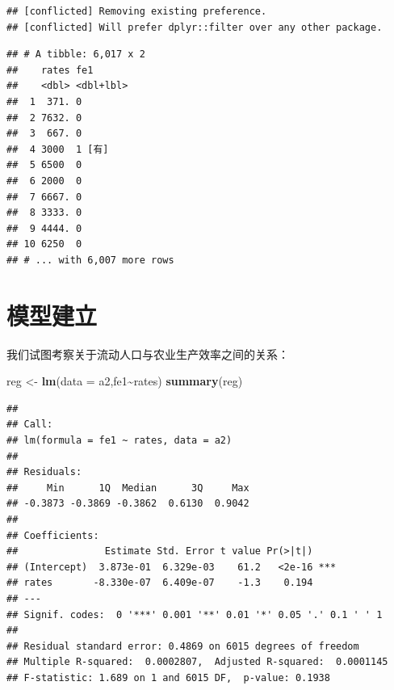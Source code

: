 \documentclass[
  oneside]{book}
\newenvironment{Shaded}{\begin{snugshade}}{\end{snugshade}}
\newcommand{\AttributeTok}[1]{\textcolor[rgb]{0.13,0.29,0.53}{#1}}
\newcommand{\DecValTok}[1]{\textcolor[rgb]{0.00,0.00,0.81}{#1}}
\newcommand{\FunctionTok}[1]{\textcolor[rgb]{0.13,0.29,0.53}{\textbf{#1}}}
\newcommand{\NormalTok}[1]{#1}
\newcommand{\OtherTok}[1]{\textcolor[rgb]{0.56,0.35,0.01}{#1}}
\newcommand{\SpecialCharTok}[1]{\textcolor[rgb]{0.81,0.36,0.00}{\textbf{#1}}}
\begin{document}
\begin{verbatim}
## [conflicted] Removing existing preference.
## [conflicted] Will prefer dplyr::filter over any other package.
\end{verbatim}

\begin{Shaded}
\end{Shaded}

\begin{verbatim}
## # A tibble: 6,017 x 2
##    rates fe1      
##    <dbl> <dbl+lbl>
##  1  371. 0        
##  2 7632. 0        
##  3  667. 0        
##  4 3000  1 [有]   
##  5 6500  0        
##  6 2000  0        
##  7 6667. 0        
##  8 3333. 0        
##  9 4444. 0        
## 10 6250  0        
## # ... with 6,007 more rows
\end{verbatim}

\hypertarget{ux6a21ux578bux5efaux7acb}{%
\section{模型建立}\label{ux6a21ux578bux5efaux7acb}}

我们试图考察关于流动人口与农业生产效率之间的关系：

\begin{Shaded}
\begin{Highlighting}[]
\NormalTok{reg }\OtherTok{\textless{}{-}} \FunctionTok{lm}\NormalTok{(}\AttributeTok{data =}\NormalTok{ a2,fe1}\SpecialCharTok{\textasciitilde{}}\NormalTok{rates)}
\FunctionTok{summary}\NormalTok{(reg)}
\end{Highlighting}
\end{Shaded}

\begin{verbatim}
## 
## Call:
## lm(formula = fe1 ~ rates, data = a2)
## 
## Residuals:
##     Min      1Q  Median      3Q     Max 
## -0.3873 -0.3869 -0.3862  0.6130  0.9042 
## 
## Coefficients:
##               Estimate Std. Error t value Pr(>|t|)    
## (Intercept)  3.873e-01  6.329e-03    61.2   <2e-16 ***
## rates       -8.330e-07  6.409e-07    -1.3    0.194    
## ---
## Signif. codes:  0 '***' 0.001 '**' 0.01 '*' 0.05 '.' 0.1 ' ' 1
## 
## Residual standard error: 0.4869 on 6015 degrees of freedom
## Multiple R-squared:  0.0002807,  Adjusted R-squared:  0.0001145 
## F-statistic: 1.689 on 1 and 6015 DF,  p-value: 0.1938
\end{verbatim}
\end{document}
